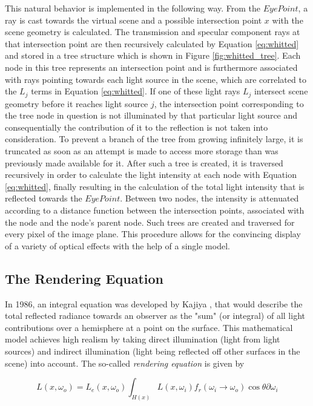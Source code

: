 This natural behavior is implemented in the following way. From the $Eye Point$, a ray is cast towards the virtual scene and a possible intersection point $x$ with the scene geometry is calculated. 
The transmission and specular component rays at that intersection point are then recursively calculated by Equation \ref{eq:whitted} and stored in a tree structure which is shown in Figure \ref{fig:whitted_tree}. 
Each node in this tree represents an intersection point and is furthermore associated with rays pointing towards each light source in the scene, which are correlated to the $L_{j}$ terms in Equation \ref{eq:whitted}. If one of these light rays $L_{j}$ intersect scene geometry before it reaches light source $j$, the intersection point corresponding to the tree node in question is not illuminated by that particular light source and consequentially the contribution of it to the reflection is not taken into consideration. To prevent a branch of the tree from growing infinitely large, it is truncated as soon as an attempt is made to access more storage than was previously made available for it. After such a tree is created, it is traversed recursively in order to calculate the light intensity at each node with Equation \ref{eq:whitted}, finally resulting in the calculation of the total light intensity that is reflected towards the $Eye Point$. Between two nodes, the intensity is attenuated according to a distance function between the intersection points, associated with the node and the node's parent node. 
Such trees are created and traversed for every pixel of the image plane. This procedure allows for the convincing display of a variety of optical effects with the help of a single model.

\subsection{The Rendering Equation}

In 1986, an integral equation was developed by Kajiya \cite{kajiya1986rendering}, that would describe the total reflected radiance towards an observer as the "sum" (or integral) of all light contributions over a hemisphere at a point on the surface. This mathematical model achieves high realism by taking direct illumination (light from light sources) and indirect illumination (light being reflected off other surfaces in the scene) into account.
The so-called \emph{rendering equation} is given by

\begin{equation}\label{eq:renderingeq}
L(x, \omega_{o}) = L_{e}(x, \omega_{o}) \int_{H(x)} L(x, \omega_{i})f_{r}(\omega_{i} \rightarrow \omega_{o})\cos\theta\partial\omega_{i}
\end{equation}

